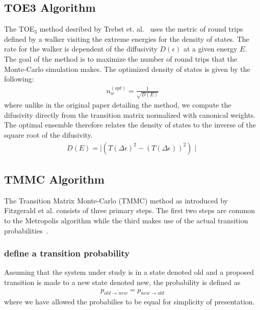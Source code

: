 \documentclass[letterpaper,twocolumn,amsmath,amssymb,pre,aps,10pt]{revtex4-1}
\begin{document}
\subsection{TOE3 Algorithm}
The TOE$_3$ method desribed by Trebst et. al.~\cite{trebst2004optimizing} uses the metric of round trips defined by a walker visiting the extreme energies for the density of states.  The rate for the walker is dependent of the diffusivity $D(\epsilon)$ at a given energy $E$.  The goal of the method is to maximize the number of round trips that the Monte-Carlo simulation makes.  The optimized density of states is given by the following:
\begin{align}
  n_{w}^{(opt)} = \frac{1}{\sqrt{D(E)}}
\end{align}
where unlike in the original paper detailing the method, we compute the difusivity directly from the transition matrix normalized with canonical weights.  The optimal ensemble therefore relates the density of states to the inverse of the square root of the difusivity.
\begin{align}
  D(E) = \mid (T(\Delta\epsilon)^2 - (T(\Delta\epsilon))^2) \mid
\end{align}





\subsection{TMMC Algorithm}
The Transition Matrix Monte-Carlo (TMMC) method as introduced by Fitzgerald et al.
consists of three primary steps.  The first two steps are common to the Metropolis 
algorithm while the third makes use of the actual transition 
probabilities~\cite{fitzgerald2000monte}.

\subsubsection{define a transition probability}
Assuming that the system under study is in a state denoted old and a proposed transition
is made to a new state denoted new, the probability is defined as
\begin{align}
  p_{old \rightarrow new} = p_{new \rightarrow old}
\end{align}
where we have allowed the probabilies to be equal for simplicity of presentation.
\end{document}
